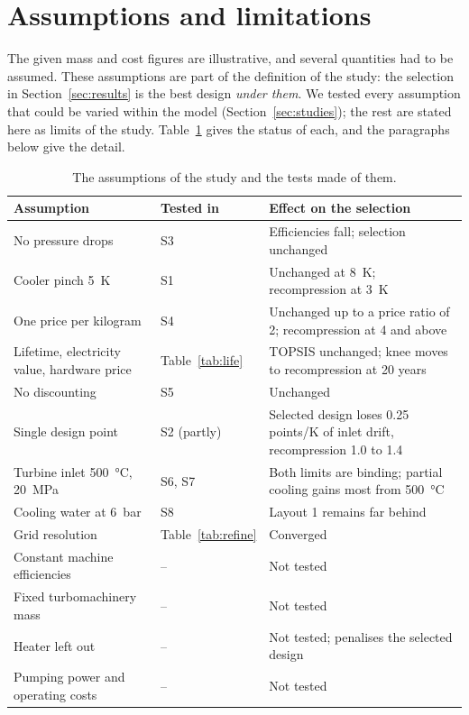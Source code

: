 \section{Assumptions and limitations}\label{sec:limits}

The given mass and cost figures are illustrative, and several quantities had to be assumed. These assumptions are part of the definition of the study: the selection in Section~\ref{sec:results} is the best design \emph{under them}. We tested every assumption that could be varied within the model (Section~\ref{sec:studies}); the rest are stated here as limits of the study. Table~\ref{tab:assume} gives the status of each, and the paragraphs below give the detail.

\begin{table}[h]\centering\footnotesize
\setlength{\tabcolsep}{4pt}
\begin{tabularx}{\textwidth}{@{}l l >{\raggedright\arraybackslash}X@{}}
\toprule
Assumption & Tested in & Effect on the selection\\
\midrule
No pressure drops & S3 & Efficiencies fall; selection unchanged \\
Cooler pinch \SI{5}{K} & S1 & Unchanged at \SI{8}{K}; recompression at \SI{3}{K}\\
One price per kilogram & S4 & Unchanged up to a price ratio of 2; recompression at 4 and above\\
Lifetime, electricity value, hardware price & Table~\ref{tab:life} & TOPSIS unchanged; knee moves to recompression at 20 years\\
No discounting & S5 & Unchanged\\
Single design point & S2 (partly) & Selected design loses 0.25 points/K of inlet drift, recompression 1.0 to 1.4\\
Turbine inlet \SI{500}{\celsius}, \SI{20}{MPa} & S6, S7 & Both limits are binding; partial cooling gains most from \SI{500}{\celsius}\\
Cooling water at \SI{6}{bar} & S8 & Layout 1 remains far behind\\
Grid resolution & Table~\ref{tab:refine} & Converged\\
\addlinespace
Constant machine efficiencies & -- & Not tested\\
Fixed turbomachinery mass & -- & Not tested\\
Heater left out & -- & Not tested; penalises the selected design\\
Pumping power and operating costs & -- & Not tested\\
\bottomrule
\end{tabularx}
\caption{The assumptions of the study and the tests made of them.}\label{tab:assume}
\end{table}


